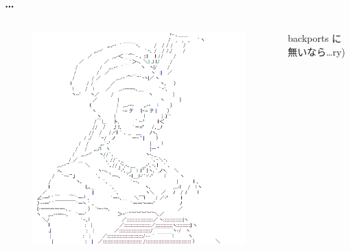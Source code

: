 \documentclass[cjk,dvipdfmx,12pt,%
hyperref={bookmarks=true,bookmarksnumbered=true,bookmarksopen=false,%
colorlinks=false,%
pdftitle={野良ビルドから始めるパッケージ作成},%
pdfauthor={佐々木洋平},%
pdfsubject={第37回関西Debian勉強会 at OSC 2010 Kansai$@$kyoto},%
}]{beamer}
\begin{document}



\begin{frame}[fragile]
\frametitle{\dots{}}


\begin{columns}[t]
\column{0.45\paperwidth}
\begin{figure}[h!]
    \centering
    \includegraphics[width=1.05\textheight]{./image201007/AA-MarieAntoinette.png}
\end{figure}


\column{0.45\paperwidth}

\begin{center}
backports に無いなら\dots{}ry)
\end{center}

\end{columns}


\end{frame}


\end{document}

